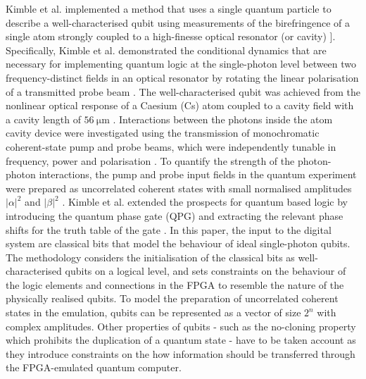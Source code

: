 Kimble et al. implemented a method that uses a single quantum particle to describe a well-characterised qubit using measurements of the \gls{birefringence} of a single atom strongly coupled to a \gls{high-finesse} optical resonator (or cavity) ]\cite{turchette1995measurement}. Specifically, Kimble et al. demonstrated the conditional dynamics that are necessary for implementing quantum logic at the single-photon level between two frequency-distinct fields in an optical resonator by rotating the linear polarisation of a transmitted probe beam \cite{turchette1995measurement}. The well-characterised qubit was achieved from the nonlinear optical response of a Caesium (Cs) atom coupled to a cavity field with a cavity length of $\SI{56}{\micro\meter}$ \cite{turchette1995measurement}. Interactions between the photons inside the atom cavity device were investigated using the transmission of monochromatic coherent-state pump and probe beams, which were independently tunable in frequency, power and polarisation \cite{turchette1995measurement}. To quantify the strength of the photon-photon interactions, the pump and probe input fields in the quantum experiment were prepared as uncorrelated coherent states with small normalised amplitudes $|\alpha|^2$ and $|\beta|^2$ \cite{turchette1995measurement}.  Kimble et al. extended the prospects for quantum based logic by introducing the quantum phase gate (QPG) and extracting the relevant phase shifts for the truth table of the gate \cite{turchette1995measurement}. In this paper, the input to the digital system are classical bits that model the behaviour of ideal single-photon qubits. The methodology considers the initialisation of the classical bits as well-characterised qubits on a logical level, and sets constraints on the behaviour of the logic elements and connections in the FPGA to resemble the nature of the physically realised qubits. To model the preparation of uncorrelated coherent states in the emulation, qubits can be represented as a vector of size $2^n$ with complex amplitudes. Other properties of qubits - such as the no-cloning property which prohibits the duplication of a quantum state - have to be taken account as they introduce constraints on the how information should be transferred through the FPGA-emulated quantum computer.

